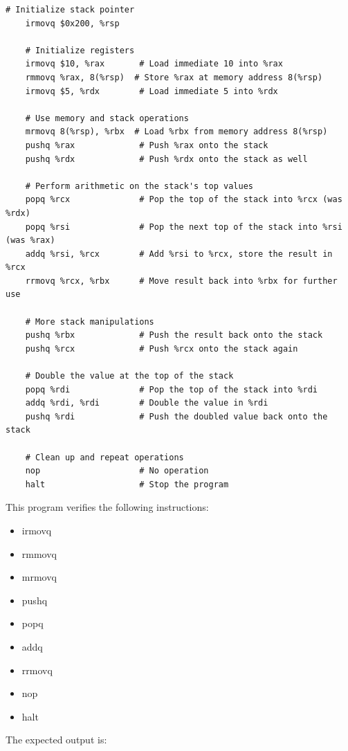 \documentclass{article}
\begin{document}
\begin{lstlisting}[language=myassembly]
    # Initialize stack pointer
    irmovq $0x200, %rsp    
    
    # Initialize registers
    irmovq $10, %rax       # Load immediate 10 into %rax
    rmmovq %rax, 8(%rsp)  # Store %rax at memory address 8(%rsp)
    irmovq $5, %rdx        # Load immediate 5 into %rdx
    
    # Use memory and stack operations
    mrmovq 8(%rsp), %rbx  # Load %rbx from memory address 8(%rsp)
    pushq %rax             # Push %rax onto the stack
    pushq %rdx             # Push %rdx onto the stack as well
    
    # Perform arithmetic on the stack's top values
    popq %rcx              # Pop the top of the stack into %rcx (was %rdx)
    popq %rsi              # Pop the next top of the stack into %rsi (was %rax)
    addq %rsi, %rcx        # Add %rsi to %rcx, store the result in %rcx
    rrmovq %rcx, %rbx      # Move result back into %rbx for further use
    
    # More stack manipulations
    pushq %rbx             # Push the result back onto the stack
    pushq %rcx             # Push %rcx onto the stack again
    
    # Double the value at the top of the stack
    popq %rdi              # Pop the top of the stack into %rdi
    addq %rdi, %rdi        # Double the value in %rdi
    pushq %rdi             # Push the doubled value back onto the stack
    
    # Clean up and repeat operations
    nop                    # No operation
    halt                   # Stop the program
\end{lstlisting}

This program verifies the following instructions:
\begin{itemize}
    \item irmovq
    \item rmmovq
    \item mrmovq
    \item pushq
    \item popq
    \item addq
    \item rrmovq
    \item nop
    \item halt
\end{itemize}

The expected output is:
\end{document}
